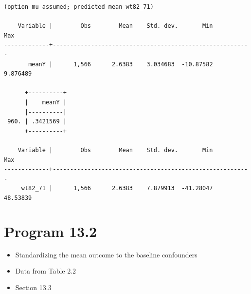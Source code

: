 \documentclass[
  10pt,
  a4paper,
]{book}
\providecommand{\tightlist}{%
  \setlength{\itemsep}{0pt}\setlength{\parskip}{0pt}}
\begin{document}
\begin{verbatim}
(option mu assumed; predicted mean wt82_71)

    Variable |        Obs        Mean    Std. dev.       Min        Max
-------------+---------------------------------------------------------
       meanY |      1,566      2.6383    3.034683  -10.87582   9.876489

      +----------+
      |    meanY |
      |----------|
 960. | .3421569 |
      +----------+

    Variable |        Obs        Mean    Std. dev.       Min        Max
-------------+---------------------------------------------------------
     wt82_71 |      1,566      2.6383    7.879913  -41.28047   48.53839
\end{verbatim}

\hypertarget{program-13.2-1}{%
\section{Program 13.2}\label{program-13.2-1}}

\begin{itemize}
\tightlist
\item
  Standardizing the mean outcome to the baseline confounders
\item
  Data from Table 2.2
\item
  Section 13.3
\end{itemize}
\end{document}

